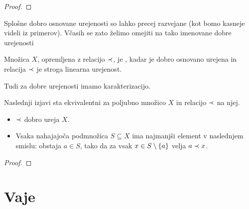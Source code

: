 \begin{proof}
\end{proof}

Splošne dobro osnovane urejenosti so lahko precej razvejane (kot bomo kasneje videli iz primerov). Včasih se zato želimo omejiti na tako imenovane dobre urejenosti

\begin{definicija}
        Množica $X$, opremljena z relacijo $\prec$, je , kadar je dobro osnovano urejena in relacija $\prec$ je stroga linearna urejenost.
\end{definicija}

Tudi za dobre urejenosti imamo karakterizacijo.

\begin{izrek}
        Naslednji izjavi sta ekvivalentni za poljubno množico $X$ in relacijo $\prec$ na njej.
        \begin{itemize}
                \item
                        $\prec$ dobro ureja $X$.
                \item
                        Vsaka nahajajoča podmnožica $S \subseteq X$ ima najmanjši element v naslednjem smislu: obstaja $a \in S$, tako da za vsak $x \in S \setminus \set{a}$ velja $a \prec x$.
        \end{itemize}
\end{izrek}

\begin{proof}
\end{proof}



\section{Vaje}


